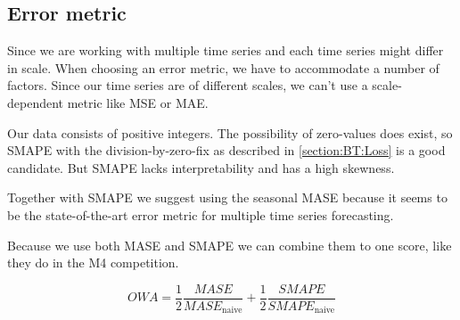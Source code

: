 \subsection{Error metric}



Since we are working with multiple time series and each time series might differ in scale.
When choosing an error metric, we have to accommodate a number of factors.
Since our time series are of different scales, we can't use a scale-dependent metric
like MSE or MAE.

Our data consists of positive integers. The possibility of zero-values does exist,
so SMAPE with the division-by-zero-fix as described in \autoref{section:BT:Loss} is a good candidate.
But SMAPE lacks interpretability and has a high skewness.

Together with SMAPE we suggest using the seasonal MASE because it seems to be the
state-of-the-art error metric for multiple time series forecasting.

Because we use both MASE and SMAPE we can combine them to one score, like
they do in the M4 competition.

\begin{equation}
  \label{eq:OWA}
  OWA = \frac{1}{2} \frac{MASE}{MASE_{\text{naive}}} + \frac{1}{2} \frac{SMAPE}{SMAPE_{\text{naive}}}
\end{equation}
